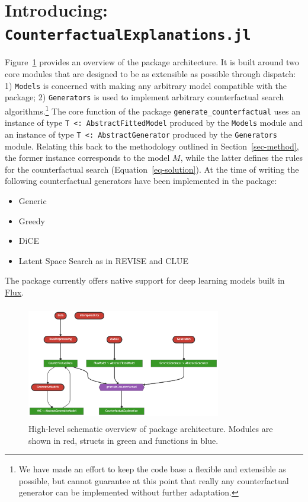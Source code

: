 \documentclass[
  letterpaper,
  DIV=11,
  numbers=noendperiod]{scrartcl}
\begin{document}
\hypertarget{sec-arch}{%
\section{\texorpdfstring{Introducing:
\texttt{CounterfactualExplanations.jl}}{Introducing: CounterfactualExplanations.jl}}\label{sec-arch}}

Figure~\ref{fig-arch} provides an overview of the package architecture.
It is built around two core modules that are designed to be as
extensible as possible through dispatch: 1) \texttt{Models} is concerned
with making any arbitrary model compatible with the package; 2)
\texttt{Generators} is used to implement arbitrary counterfactual search
algorithms.\footnote{We have made an effort to keep the code base a
  flexible and extensible as possible, but cannot guarantee at this
  point that really any counterfactual generator can be implemented
  without further adaptation.} The core function of the package
\texttt{generate\_counterfactual} uses an instance of type
\texttt{T\ \textless{}:\ AbstractFittedModel} produced by the
\texttt{Models} module and an instance of type
\texttt{T\ \textless{}:\ AbstractGenerator} produced by the
\texttt{Generators} module. Relating this back to the methodology
outlined in Section~\ref{sec-method}, the former instance corresponds to
the model \(M\), while the latter defines the rules for the
counterfactual search (Equation~\ref{eq-solution}). At the time of
writing the following counterfactual generators have been implemented in
the package:

\begin{itemize}
\item Generic \cite{wachter2017counterfactual}
\item Greedy \cite{schut2021generating}
\item DiCE \cite{mothilal2020explaining}
\item Latent Space Search as in REVISE \cite{joshi2019realistic} and CLUE \cite{antoran2020getting}
\end{itemize}

The package currently offers native support for deep learning models
built in \href{https://fluxml.ai/}{Flux}.

\begin{figure}

{\centering \includegraphics[width=3.33333in,height=2in]{www/pkg_architecture.png}

}

\caption{\label{fig-arch}High-level schematic overview of package
architecture. Modules are shown in red, structs in green and functions
in blue.}

\end{figure}
\end{document}
